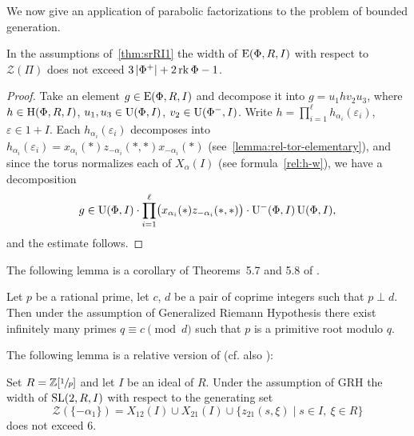 We now give an application of parabolic factorizations to the problem of bounded generation.
 
\begin{lemma}\label{lemma:srRI1_width}
In the assumptions of~\cref{thm:srRI1} the width of $\operatorname{E}(\Phi,R,I)$ with respect to $\mathcal{Z}(\Pi)$ does not exceed $3\left|\Phi^+\right|+2\operatorname{rk}\Phi-1$.
\end{lemma}
\begin{proof}
Take an element $g\in\operatorname{E}(\Phi,R,I)$ and decompose it into $g=u_1 h v_2 u_3$, where $h\in\operatorname{H}(\Phi,R,I)$, $u_1,u_3\in\operatorname{U}(\Phi,I)$, $v_2\in\operatorname{U}(\Phi^-,I)$. 
Write $h=\prod_{i=1}^\ell h_{\alpha_i}(\varepsilon_i)$, $\varepsilon\in1+I$. 
Each $h_{\alpha_i}(\varepsilon_i)$ decomposes into $h_{\alpha_i}(\varepsilon_i) = x_{\alpha_i}(*) z_{-\alpha_i}(*,*) x_{-\alpha_i}(*)$ 
 (see~\cref{lemma:rel-tor-elementary}), and since the torus normalizes each of $X_\alpha(I)$ (see formula~\eqref{rel:h-w}), we have a decomposition
\[ g\in\operatorname{U}(\Phi,I)\cdot\prod_{i=1}^\ell\bigl(x_{\alpha_i}(*)z_{-\alpha_i}(*,*)\bigr)\cdot \operatorname{U}^-(\Phi,I) \operatorname{U}(\Phi,I), \]
and the estimate follows.
\end{proof}

The following lemma is a corollary of Theorems~5.7 and 5.8 of \cite{LenMorStePrimitiveRoot}.
\begin{lemma}
Let $p$ be a rational prime, let $c$, $d$ be a pair of coprime integers such that $p \perp d$.
Then under the assumption of Generalized Riemann Hypothesis there exist infinitely many primes $q\equiv c\pmod{d}$ such that $p$ is a primitive root modulo $q$.
\end{lemma}

The following lemma is a relative version of \cite[Lemma~6]{VavSmSuUnitrEng} (cf. also \cite{VseUnitrZ1p}):

\begin{lemma}\label{lemma:Z1p}
Set $R=\mathbb{Z}[\sfrac{1}{p}]$ and let $I$ be an ideal of $R$.
Under the assumption of GRH the width of $\operatorname{SL}(2,R,I)$ with respect to the generating set $$\mathcal{Z}(\{-\alpha_1\})=X_{12}(I)\cup X_{21}(I) \cup \{z_{21}(s, \xi) \mid s\in I,\ \xi\in R\}$$ does not exceed $6$.
\end{lemma}

